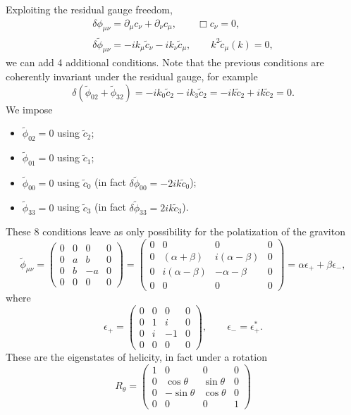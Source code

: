 \documentclass[a4paper,12pt]{book}
\begin{document}
Exploiting the residual gauge freedom,
\begin{gather*}
\delta\phi_{\mu\nu}=\partial_\mu c_\nu+\partial_\nu c_\mu,\qquad \Box c_\nu=0,\\
\delta\tilde\phi_{\mu\nu}=-ik_\mu\tilde c_\nu-ik_\nu\tilde c_\mu,\qquad k^2\tilde c_\mu(k)=0,
\end{gather*}
we can add 4 additional conditions. Note that the previous conditions are coherently invariant under the residual gauge, for example
\[\delta(\tilde\phi_{02}+\tilde\phi_{32})=-ik_0\tilde c_2-ik_3\tilde c_2=-ik\tilde c_2+ik\tilde c_2=0.\]
We impose
\begin{itemize}
\item $\tilde\phi_{02}=0$ using $\tilde c_2$;
\item $\tilde\phi_{01}=0$ using $\tilde c_1$;
\item $\tilde\phi_{00}=0$ using $\tilde c_0$ (in fact $\delta\tilde\phi_{00}=-2ik\tilde c_0$);
\item $\tilde\phi_{33}=0$ using $\tilde c_3$ (in fact $\delta\tilde\phi_{33}=2ik\tilde c_3$).
\end{itemize}
These 8 conditions leave as only possibility for the polatization of the graviton
\[\tilde\phi_{\mu\nu}=
\begin{pmatrix}
0 & 0 & 0 & 0\\
0 & a & b & 0\\
0 & b & -a & 0\\
0 & 0 & 0 & 0
\end{pmatrix}=
\begin{pmatrix}
0 & 0 & 0 & 0\\
0 & (\alpha+\beta) & i(\alpha-\beta) & 0\\
0 & i(\alpha-\beta) & -\alpha-\beta & 0\\
0 & 0 & 0 & 0
\end{pmatrix}
=\alpha\epsilon_++\beta\epsilon_-,\]
where
\[\epsilon_+=
\begin{pmatrix}
0 & 0 & 0 & 0\\
0 & 1 & i & 0\\
0 & i & -1 & 0\\
0 & 0 & 0 & 0
\end{pmatrix},\qquad
\epsilon_-=\epsilon_+^*.
\]
These are the eigenstates of helicity, in fact under a rotation
\[R_\theta=
\begin{pmatrix}
1 & 0 & 0 & 0\\
0 & \cos\theta & \sin\theta & 0\\
0 & -\sin\theta & \cos\theta & 0\\
0 & 0 & 0 & 1
\end{pmatrix}\]
\end{document}
